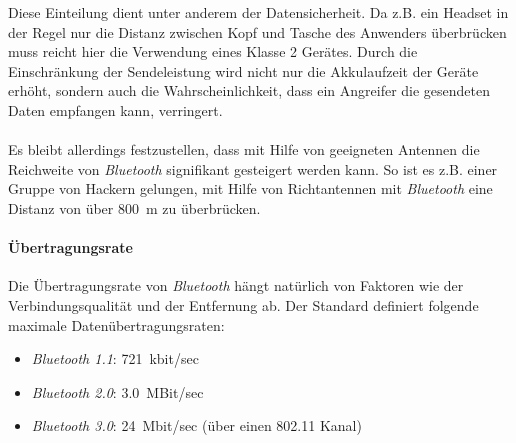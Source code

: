                 Diese Einteilung dient unter anderem der Datensicherheit. Da z.B. 
                ein Headset in der Regel nur die Distanz zwischen Kopf und Tasche
                des Anwenders überbrücken muss reicht hier die Verwendung eines Klasse 2
                Gerätes. Durch die Einschränkung der Sendeleistung wird nicht nur die
                Akkulaufzeit der Geräte erhöht, sondern auch die Wahrscheinlichkeit,
                dass ein Angreifer die gesendeten Daten empfangen kann, verringert.\\
                \\
                Es bleibt allerdings festzustellen, dass mit Hilfe von geeigneten
                Antennen die Reichweite von \emph{Bluetooth} signifikant gesteigert werden
                kann. So ist es z.B. einer Gruppe von Hackern gelungen, mit Hilfe von
                Richtantennen mit \emph{Bluetooth} eine Distanz von über 800~m zu überbrücken.

            \paragraph{Übertragungsrate}
                Die Übertragungsrate von \emph{Bluetooth} hängt natürlich von Faktoren wie
                der Verbindungsqualität und der Entfernung ab. Der Standard definiert
                folgende maximale Datenübertragungsraten:

                \begin{itemize}
                    \item{\emph{Bluetooth 1.1}:} 721~kbit/sec
                    \item{\emph{Bluetooth 2.0}:} 3.0~MBit/sec
                    \item{\emph{Bluetooth 3.0}:} 24~Mbit/sec (über einen 802.11 Kanal)
                \end{itemize}

